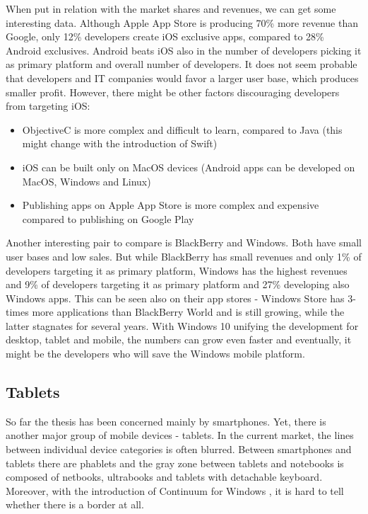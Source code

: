 \documentclass[english,master,public,dept460,male,cpdeclaration,oneside]{diploma}
\begin{document}
When put in relation with the market shares and revenues, we can get some interesting data. Although Apple App Store is producing 70\% more revenue than Google, only 12\% developers create iOS exclusive apps, compared to 28\% Android exclusives. Android beats iOS also in the number of developers picking it as primary platform and overall number of developers. It does not seem probable that developers and IT companies would favor a larger user base, which produces smaller profit. However, there might be other factors discouraging developers from targeting iOS:
\begin{itemize}
	\item ObjectiveC is more complex and difficult to learn, compared to Java (this might change with the introduction of Swift)
	\item iOS can be built only on MacOS devices (Android apps can be developed on MacOS, Windows and Linux)
	\item Publishing apps on Apple App Store is more complex and expensive compared to publishing on Google Play
\end{itemize}

Another interesting pair to compare is BlackBerry and Windows. Both have small user bases and low sales. But while BlackBerry has small revenues and only 1\% of developers targeting it as primary platform, Windows has the highest revenues and 9\% of developers targeting it as primary platform and 27\% developing also Windows apps. This can be seen also on their app stores - Windows Store has 3-times more applications than BlackBerry World and is still growing, while the latter stagnates for several years. With Windows 10 unifying the development for desktop, tablet and mobile, the numbers can grow even faster and eventually, it might be the developers who will save the Windows mobile platform.

\subsection{Tablets}
So far the thesis has been concerned mainly by smartphones. Yet, there is another major group of mobile devices - tablets. In the current market, the lines between individual device categories is often blurred. Between smartphones and tablets there are phablets and the gray zone between tablets and notebooks is composed of netbooks, ultrabooks and tablets with detachable keyboard. Moreover, with the introduction of Continuum for Windows \cite{microsoftContinuum}, it is hard to tell whether there is a border at all.
\end{document}
